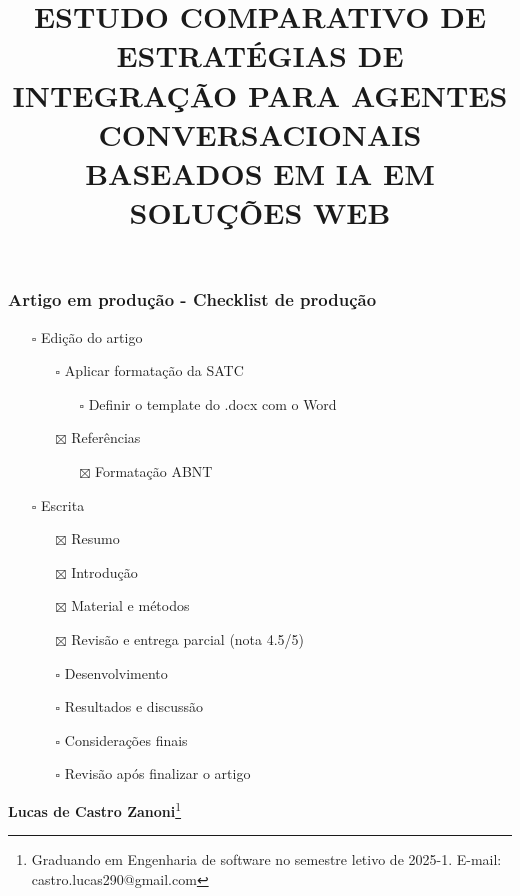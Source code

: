\documentclass[
]{article}
\title{\textbf{ESTUDO COMPARATIVO DE ESTRATÉGIAS DE INTEGRAÇÃO PARA
AGENTES CONVERSACIONAIS BASEADOS EM IA EM SOLUÇÕES WEB}}
\author{}
\date{}
\providecommand{\tightlist}{%
  \setlength{\itemsep}{0pt}\setlength{\parskip}{0pt}}
\begin{document}
\maketitle

\subsubsection{Artigo em produção - Checklist de
produção}\label{artigo-em-produuxe7uxe3o---checklist-de-produuxe7uxe3o}

\begin{itemize}
\tightlist
\item[$\square$]
  Edição do artigo

  \begin{itemize}
  \tightlist
  \item[$\square$]
    Aplicar formatação da SATC

    \begin{itemize}
    \tightlist
    \item[$\square$]
      Definir o template do .docx com o Word
    \end{itemize}
  \item[$\boxtimes$]
    Referências

    \begin{itemize}
    \tightlist
    \item[$\boxtimes$]
      Formatação ABNT
    \end{itemize}
  \end{itemize}
\item[$\square$]
  Escrita

  \begin{itemize}
  \tightlist
  \item[$\boxtimes$]
    Resumo
  \item[$\boxtimes$]
    Introdução
  \item[$\boxtimes$]
    Material e métodos
  \item[$\boxtimes$]
    Revisão e entrega parcial (nota 4.5/5)
  \item[$\square$]
    Desenvolvimento
  \item[$\square$]
    Resultados e discussão
  \item[$\square$]
    Considerações finais
  \item[$\square$]
    Revisão após finalizar o artigo
  \end{itemize}
\end{itemize}

\textbf{Lucas de Castro Zanoni}\footnote{Graduando em Engenharia de
  software no semestre letivo de 2025-1. E-mail:
  castro.lucas290@gmail.com}
\end{document}
